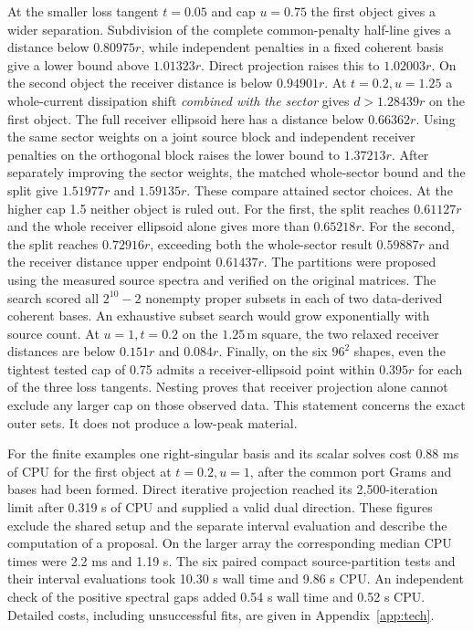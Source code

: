 At the smaller loss tangent $t=0.05$ and cap $u=0.75$ the first object gives a wider separation. Subdivision of the complete common-penalty half-line gives a distance below $0.80975r$, while independent penalties in a fixed coherent basis give a lower bound above $1.01323r$. Direct projection raises this to $1.02003r$. On the second object the receiver distance is below $0.94901r$. At $t=0.2,u=1.25$ a whole-current dissipation shift \emph{combined with the sector} gives $d>1.28439r$ on the first object. The full receiver ellipsoid here has a distance below $0.66362r$. Using the same sector weights on a joint source block and independent receiver penalties on the orthogonal block raises the lower bound to $1.37213r$. After separately improving the sector weights, the matched whole-sector bound and the split give $1.51977r$ and $1.59135r$. These compare attained sector choices. At the higher cap 1.5 neither object is ruled out. For the first, the split reaches $0.61127r$ and the whole receiver ellipsoid alone gives more than $0.65218r$. For the second, the split reaches $0.72916r$, exceeding both the whole-sector result $0.59887r$ and the receiver distance upper endpoint $0.61437r$. The partitions were proposed using the measured source spectra and verified on the original matrices. The search scored all $2^{10}-2$ nonempty proper subsets in each of two data-derived coherent bases. An exhaustive subset search would grow exponentially with source count. At $u=1,t=0.2$ on the $1.25\,\mathrm m$ square, the two relaxed receiver distances are below $0.151r$ and $0.084r$. Finally, on the six $96^2$ shapes, even the tightest tested cap of 0.75 admits a receiver-ellipsoid point within $0.395r$ for each of the three loss tangents. Nesting proves that receiver projection alone cannot exclude any larger cap on those observed data. This statement concerns the exact outer sets. It does not produce a low-peak material.

For the finite examples one right-singular basis and its scalar solves cost 0.88 ms of CPU for the first object at $t=0.2,u=1$, after the common port Grams and bases had been formed. Direct iterative projection reached its 2,500-iteration limit after 0.319 s of CPU and supplied a valid dual direction. These figures exclude the shared setup and the separate interval evaluation and describe the computation of a proposal. On the larger array the corresponding median CPU times were 2.2 ms and 1.19 s. The six paired compact source-partition tests and their interval evaluations took 10.30 s wall time and 9.86 s CPU. An independent check of the positive spectral gaps added 0.54 s wall time and 0.52 s CPU. Detailed costs, including unsuccessful fits, are given in Appendix~\ref{app:tech}.

